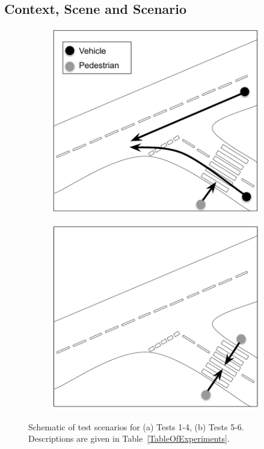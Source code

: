 \subsection{Context, Scene and Scenario}\label{TestsDescriptionAndTechnicalities}
\begin{figure}[!t]
    \centering
    \begin{subfigure}{.24\textwidth}
        \includegraphics[width=1\textwidth]{../other/figures/TestCasesDiagramV2_a.pdf}
        \caption{}
        \label{Test_a}
    \end{subfigure}
    \begin{subfigure}{.24\textwidth}
        \includegraphics[width=1\textwidth]{../other/figures/TestCasesDiagramV2_b.pdf}
        \caption{}
        \label{Test_b}
    \end{subfigure}
    \caption{Schematic of test scenarios for (a) Tests 1-4, (b) Tests 5-6. Descriptions are given in Table~\ref{TableOfExperiments}.}\label{f:test_a_and_b}
\end{figure}

